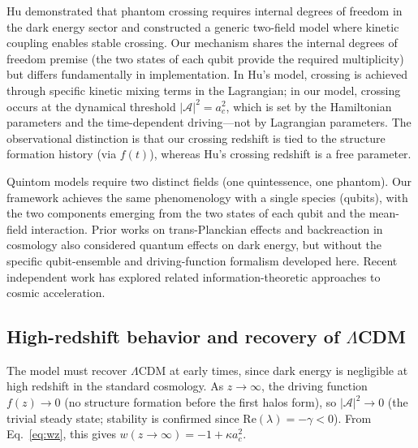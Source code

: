 \documentclass[aps,prd,twocolumn,superscriptaddress]{revtex4-2}
\begin{document}
Hu \cite{Hu:2005} demonstrated that phantom crossing requires internal degrees of freedom in the dark energy sector and constructed a generic two-field model where kinetic coupling enables stable crossing. Our mechanism shares the internal degrees of freedom premise (the two states of each qubit provide the required multiplicity) but differs fundamentally in implementation. In Hu's model, crossing is achieved through specific kinetic mixing terms in the Lagrangian; in our model, crossing occurs at the dynamical threshold $|\mathcal{A}|^2 = a_c^2$, which is set by the Hamiltonian parameters and the time-dependent driving---not by Lagrangian parameters. The observational distinction is that our crossing redshift is tied to the structure formation history (via $f(t)$), whereas Hu's crossing redshift is a free parameter.

Quintom models \cite{Feng:2005} require two distinct fields (one quintessence, one phantom). Our framework achieves the same phenomenology with a single species (qubits), with the two components emerging from the two states of each qubit and the mean-field interaction. Prior works on trans-Planckian effects and backreaction in cosmology \cite{Martineau:2005,Zhao:2009} also considered quantum effects on dark energy, but without the specific qubit-ensemble and driving-function formalism developed here. Recent independent work \cite{Mishra:2026} has explored related information-theoretic approaches to cosmic acceleration.

\subsection{High-redshift behavior and recovery of $\Lambda$CDM}
\label{sec:highz}

The model must recover $\Lambda$CDM at early times, since dark energy is negligible at high redshift in the standard cosmology. As $z \to \infty$, the driving function $f(z) \to 0$ (no structure formation before the first halos form), so $|\mathcal{A}|^2 \to 0$ (the trivial steady state; stability is confirmed since $\mathrm{Re}(\lambda) = -\gamma < 0$). From Eq.~\eqref{eq:wz}, this gives $w(z\to\infty) = -1 + \kappa a_c^2$.
\end{document}
